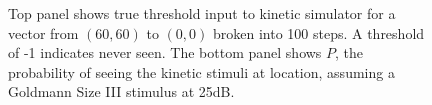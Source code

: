 \documentclass{article}
\begin{document}
\begin{figure}
  \caption{Top panel shows true threshold input to kinetic simulator for a vector from 
        $(60,60)$ to $(0,0)$ broken into 100 steps. A threshold of -1 indicates never seen.
         The bottom panel shows $P$, the probability of 
         seeing the kinetic stimuli at location,
         assuming a Goldmann Size III stimulus at 25dB.
  }
  \label{fig-eg1}
\end{figure}
\end{document}
